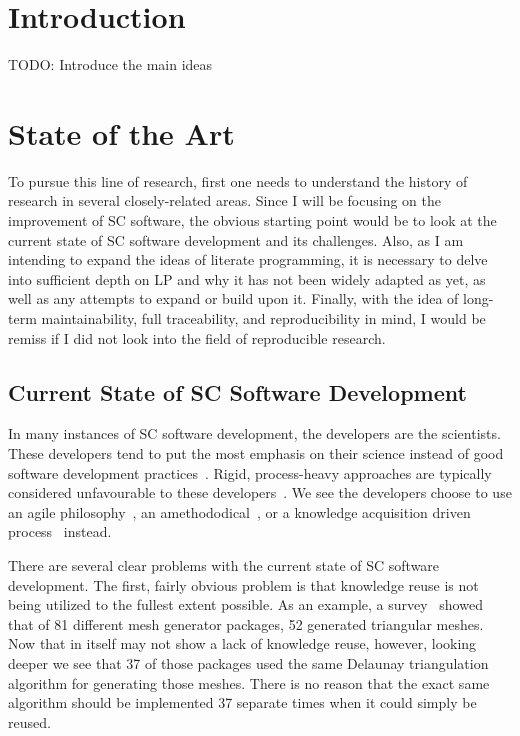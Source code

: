 \documentclass{article}
\begin{document}
\section{Introduction}

TODO: Introduce the main ideas

\section{State of the Art}

To pursue this line of research, first one needs to understand the history of research in several closely-related areas. Since I will be focusing on the improvement of SC software, the obvious starting point would be to look at the current state of SC software development and its challenges. Also, as I am intending to expand the ideas of literate programming, it is necessary to delve into sufficient depth on LP and why it has not been widely adapted as yet, as well as any attempts to expand or build upon it. Finally, with the idea of long-term maintainability, full traceability, and reproducibility in mind, I would be remiss if I did not look into the field of reproducible research.

\subsection{Current State of SC Software Development}

In many instances of SC software development, the developers are the scientists. These developers tend to put the most emphasis on their science instead of good software development practices~\cite{Kelly2007}. Rigid, process-heavy approaches are typically considered unfavourable to these developers~\cite{CarverEtAl2007}. We see the developers choose to use an agile philosophy~\cite{AckroydEtAl2008, CarverEtAl2007, EasterbrookAndJohns2009, Segal2005}, an amethododical~\cite{Kelly2013}, or a knowledge acquisition driven process~\cite{Kelly2015} instead.

There are several clear problems with the current state of SC software development. The first, fairly obvious problem is that knowledge reuse is not being utilized to the fullest extent possible. As an example, a survey~\cite{Owen1998} showed that of 81 different mesh generator packages, 52 generated triangular meshes. Now that in itself may not show a lack of knowledge reuse, however, looking deeper we see that 37 of those packages used the same Delaunay triangulation algorithm for generating those meshes. There is no reason that the exact same algorithm should be implemented 37 separate times when it could simply be reused.
\end{document}
